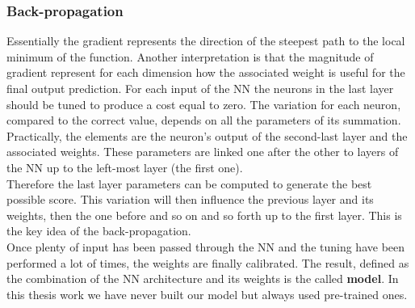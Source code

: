 \subsubsection*{Back-propagation}
Essentially the gradient represents the direction of the steepest path to the local minimum of the function. Another interpretation is that the magnitude of gradient represent for each dimension how the associated weight is useful for the final output prediction. For each input of the NN the neurons in the last layer should be tuned to produce a cost equal to zero. The variation for each neuron, compared to the correct value, depends on all the parameters of its summation. Practically, the elements are the neuron's output of the second-last layer and the associated weights. These parameters are linked one after the other to layers of the NN up to the left-most layer (the first one).\\
Therefore the last layer parameters can be computed to generate the best possible score. This variation will then influence the previous layer and its weights, then the one before and so on and so forth up to the first layer. This is the key idea of the back-propagation.\\
Once plenty of input has been passed through the NN and the tuning have been performed a lot of times, the weights are finally calibrated. The result, defined as the combination of the NN architecture and its weights is the called \textbf{model}. In this thesis work we have never built our model but always used pre-trained ones.

